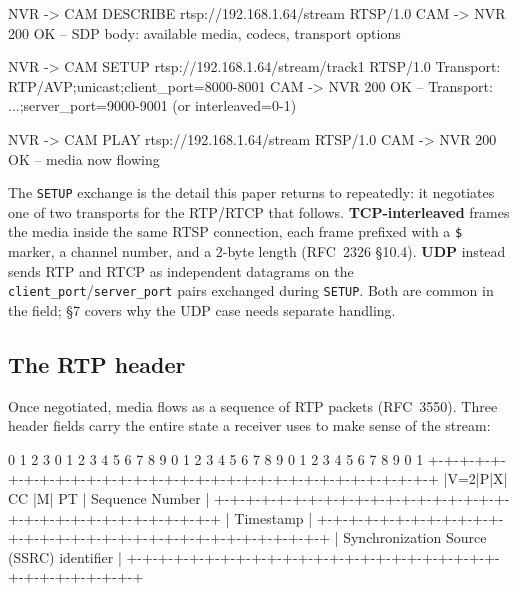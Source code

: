\documentclass[11pt,a4paper]{article}
\newcommand{\code}[1]{\texttt{\small #1}}
\begin{document}
\begin{consolebox}
\begin{consolev}
\textcolor{consoleink!60}{NVR -> CAM}  DESCRIBE rtsp://192.168.1.64/stream RTSP/1.0
\textcolor{consoleink!60}{CAM -> NVR}  200 OK -- SDP body: available media, codecs, transport options

\textcolor{consoleink!60}{NVR -> CAM}  SETUP rtsp://192.168.1.64/stream/track1 RTSP/1.0
              Transport: RTP/AVP;unicast;client_port=8000-8001
\textcolor{consoleink!60}{CAM -> NVR}  200 OK -- Transport: ...;server_port=9000-9001  \textcolor{accentc}{(or interleaved=0-1)}

\textcolor{consoleink!60}{NVR -> CAM}  PLAY rtsp://192.168.1.64/stream RTSP/1.0
\textcolor{consoleink!60}{CAM -> NVR}  200 OK -- media now flowing
\end{consolev}
\end{consolebox}

The \code{SETUP} exchange is the detail this paper returns to repeatedly: it negotiates one of two transports for the RTP/RTCP that follows. \textbf{TCP-interleaved} frames the media inside the same RTSP connection, each frame prefixed with a \code{\$} marker, a channel number, and a 2-byte length (RFC~2326 \S10.4). \textbf{UDP} instead sends RTP and RTCP as independent datagrams on the \code{client\_port}/\code{server\_port} pairs exchanged during \code{SETUP}. Both are common in the field; \S7 covers why the UDP case needs separate handling.

\subsection{The RTP header}
Once negotiated, media flows as a sequence of RTP packets (RFC~3550). Three header fields carry the entire state a receiver uses to make sense of the stream:

\begin{consolebox}
\begin{consolev}
 0                   1                   2                   3
 0 1 2 3 4 5 6 7 8 9 0 1 2 3 4 5 6 7 8 9 0 1 2 3 4 5 6 7 8 9 0 1
+-+-+-+-+-+-+-+-+-+-+-+-+-+-+-+-+-+-+-+-+-+-+-+-+-+-+-+-+-+-+-+-+
|V=2|P|X|  CC   |M|     PT      |       Sequence Number        |
+-+-+-+-+-+-+-+-+-+-+-+-+-+-+-+-+-+-+-+-+-+-+-+-+-+-+-+-+-+-+-+-+
|                           Timestamp                           |
+-+-+-+-+-+-+-+-+-+-+-+-+-+-+-+-+-+-+-+-+-+-+-+-+-+-+-+-+-+-+-+-+
|           Synchronization Source (SSRC) identifier            |
+-+-+-+-+-+-+-+-+-+-+-+-+-+-+-+-+-+-+-+-+-+-+-+-+-+-+-+-+-+-+-+-+
\end{consolev}
\end{consolebox}
\end{document}
